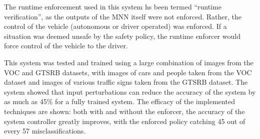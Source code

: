 The runtime enforcement used in this system hs been termed ``runtime verification'', as the outputs of the \ac{MNN} itself were not enforced.
Rather, the control of the vehicle (autonomous or driver operated) was enforced.
If a situation was deemed unsafe by the safety policy, the runtime enforcer would force control of the vehicle to the driver.

This system was tested and trained using a large combination of images from the \ac{VOC} and \ac{GTSRB} datasets, with images of cars and people taken from the \ac{VOC} dataset and images of various traffic signs taken from the \ac{GTSRB} dataset.
The system showed that input perturbations can reduce the accuracy of the system by as much as 45\% for a fully trained system.
The efficacy of the implemented techniques are shown: both with and without the enforcer, the accuracy of the system controller greatly improves, with the enforced policy catching 45 out of every 57 misclassifications.

























